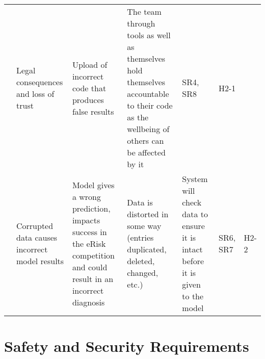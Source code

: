 \documentclass{article}
\begin{document}
\begin{landscape}
\begin{longtable}{|p{}|p{}|p{}|p{}|p{}|p{}|p{}|}
        & Legal consequences and loss of trust 
        & Upload of incorrect code that produces false results
        & The team through tools as well as themselves hold themselves accountable to their code as the wellbeing of others can be affected by it
        & SR4, SR8
        & H2-1 \\
        \cline{2-7}
        & Corrupted data causes incorrect model results
        & Model gives a wrong prediction, impacts success in the eRisk competition and could result in an incorrect diagnosis
        & Data is distorted in some way (entries duplicated, deleted, changed, etc.)
        & System will check data to ensure it is intact before it is given to the model
        & SR6, SR7
        & H2-2 \\
        \hline
    \end{longtable}
\end{landscape}


\section{Safety and Security Requirements}
\end{document}
